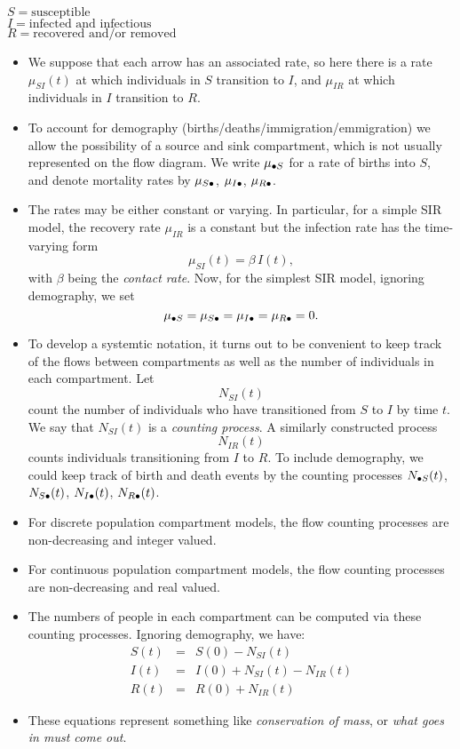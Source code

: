 \documentclass[]{article}
\begin{document}
\hypertarget{htmlwidget-c91d56e95a6c9d1fe971}{}

\(S = \text{susceptible}\)\\
\(I = \text{infected and infectious}\)\\
\(R = \text{recovered and/or removed}\)

\begin{itemize}
\item
  We suppose that each arrow has an associated rate, so here there is a
  rate \(\mu_{SI}(t)\) at which individuals in \(S\) transition to
  \(I\), and \(\mu_{IR}\) at which individuals in \(I\) transition to
  \(R\).
\item
  To account for demography (births/deaths/immigration/emmigration) we
  allow the possibility of a source and sink compartment, which is not
  usually represented on the flow diagram. We write
  \(\mu_{{\small{\bullet}}S}\) for a rate of births into \(S\), and
  denote mortality rates by \(\mu_{S{\small\bullet}}\),
  \(\mu_{I{\small\bullet}}\), \(\mu_{R{\small\bullet}}\).
\item
  The rates may be either constant or varying. In particular, for a
  simple SIR model, the recovery rate \(\mu_{IR}\) is a constant but the
  infection rate has the time-varying form
  \[\mu_{SI}(t)=\beta \, I(t),\] with \(\beta\) being the \emph{contact
  rate}. Now, for the simplest SIR model, ignoring demography, we set
  \[ \mu_{{\small{\bullet}}S}=\mu_{S{\small{\bullet}}}=\mu_{I{\small{\bullet}}}=\mu_{R{\small{\bullet}}}=0.\]
\item
  To develop a systemtic notation, it turns out to be convenient to keep
  track of the flows between compartments as well as the number of
  individuals in each compartment. Let \[N_{SI}(t)\] count the number of
  individuals who have transitioned from \(S\) to \(I\) by time \(t\).
  We say that \(N_{SI}(t)\) is a \emph{counting process}. A similarly
  constructed process \[N_{IR}(t)\] counts individuals transitioning
  from \(I\) to \(R\). To include demography, we could keep track of
  birth and death events by the counting processes
  \(N_{{\small{\bullet}} S}(t)\), \(N_{S{\small{\bullet}}}(t)\),
  \(N_{I{\small{\bullet}}}(t)\), \(N_{R{\small{\bullet}}}(t)\).
\item
  For discrete population compartment models, the flow counting
  processes are non-decreasing and integer valued.
\item
  For continuous population compartment models, the flow counting
  processes are non-decreasing and real valued.
\item
  The numbers of people in each compartment can be computed via these
  counting processes. Ignoring demography, we have:
  \[\begin{array}{lcl} 
  S(t)&=& S(0) - N_{SI}(t)
  \\
  I(t)&=& I(0) + N_{SI}(t) - N_{IR}(t)
  \\
  R(t) &=& R(0) + N_{IR}(t)
  \end{array}\]
\item
  These equations represent something like \emph{conservation of mass},
  or \emph{what goes in must come out}.
\end{itemize}
\end{document}
